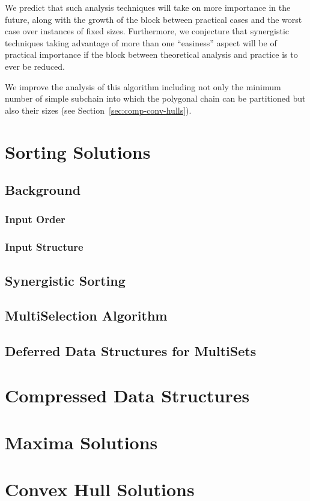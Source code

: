 We predict that such analysis techniques will take on more importance
in the future, along with the growth of the block between practical
cases and the worst case over instances of fixed sizes. Furthermore,
we conjecture that synergistic techniques taking advantage of more
than one ``easiness'' aspect will be of practical importance if the
block between theoretical analysis and practice is to ever be reduced.



\begin{INUTILE}
  We improve the analysis of this algorithm including not only the
  minimum number of simple subchain into which the polygonal chain can
  be partitioned but also their sizes (see
  Section~\ref{sec:comp-conv-hulls}).
\end{INUTILE}
%



%

\section{Sorting Solutions}
\label{sec:sort}

\subsection{Background}
\label{sec:back}

\subsubsection{Input Order}
\label{sec:order}

\subsubsection{Input Structure}
\label{sec:structure}

\subsection{Synergistic Sorting}
\label{sec:syn-sort}

\subsection{MultiSelection Algorithm}
\label{sec:multiselect}

\subsection{Deferred Data Structures for MultiSets}
\label{sec:dds}

\section{Compressed Data Structures}
\label{sec:compressed}

\section{Maxima Solutions}
\label{sec:maxima}

\section{Convex Hull Solutions}
\label{sec:hull}

